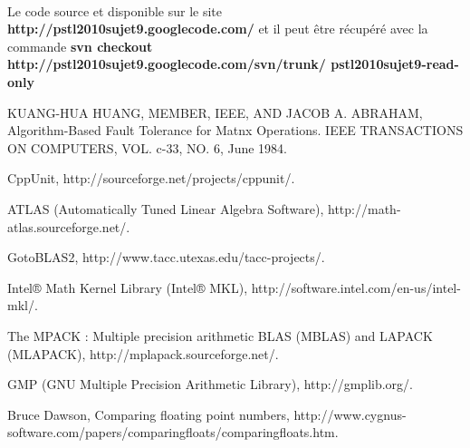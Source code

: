 \documentclass[a4paper, 10pt]{report}
\begin{document}
\paragraph*{}
Le code source et disponible sur le site \textbf{http://pstl2010sujet9.googlecode.com/} et il peut \^etre récupéré avec la commande\newline
\textbf{svn checkout http://pstl2010sujet9.googlecode.com/svn/trunk/ pstl2010sujet9-read-only}

\begin{thebibliography}{1}

KUANG-HUA HUANG, MEMBER, IEEE, AND JACOB A. ABRAHAM,
Algorithm-Based Fault Tolerance for Matnx Operations.
IEEE TRANSACTIONS ON COMPUTERS,
VOL. c-33,
NO. 6,
June 1984.

CppUnit,
http://sourceforge.net/projects/cppunit/.

ATLAS (Automatically Tuned Linear Algebra Software),
http://math-atlas.sourceforge.net/.

GotoBLAS2,
http://www.tacc.utexas.edu/tacc-projects/.

Intel® Math Kernel Library (Intel® MKL),
http://software.intel.com/en-us/intel-mkl/.

The MPACK : Multiple precision arithmetic BLAS (MBLAS) and LAPACK (MLAPACK),
http://mplapack.sourceforge.net/.

GMP (GNU Multiple Precision Arithmetic Library),
http://gmplib.org/.

Bruce Dawson,
Comparing floating point numbers,
http://www.cygnus-software.com/papers/comparingfloats/comparingfloats.htm.

\end{thebibliography}
\end{document}
